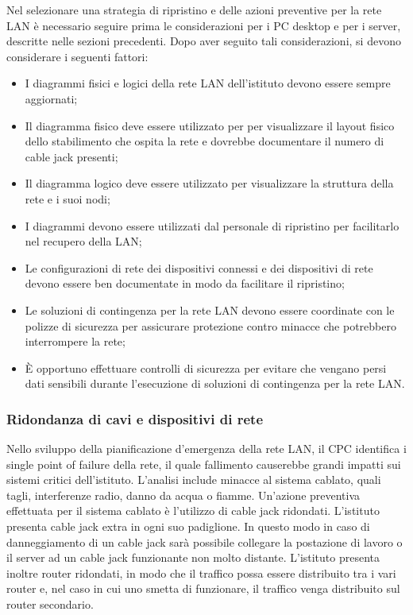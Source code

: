 \documentclass[12pt, a4paper, titlepage]{report}
\begin{document}
	Nel selezionare una strategia di ripristino e delle azioni preventive per la rete LAN è necessario seguire prima le considerazioni per i PC desktop e per i server, descritte nelle sezioni precedenti. Dopo aver seguito tali considerazioni, si devono considerare i seguenti fattori:
	\begin{itemize}
		\item I diagrammi fisici e logici della rete LAN dell'istituto devono essere sempre aggiornati;
		\item Il diagramma fisico deve essere utilizzato per per visualizzare il layout fisico dello stabilimento che ospita la rete e dovrebbe documentare il numero di cable jack presenti;
		\item Il diagramma logico deve essere utilizzato per visualizzare la struttura della rete e i suoi nodi;
		\item I diagrammi devono essere utilizzati dal personale di ripristino per facilitarlo nel recupero della LAN;
		\item Le configurazioni di rete dei dispositivi connessi e dei dispositivi di rete devono essere ben documentate in modo da facilitare il ripristino;
		\item Le soluzioni di contingenza per la rete LAN devono essere coordinate con le polizze di sicurezza per assicurare protezione contro minacce che potrebbero interrompere la rete;
		\item È opportuno effettuare controlli di sicurezza per evitare che vengano persi dati sensibili durante l'esecuzione di soluzioni di contingenza per la rete LAN.
	\end{itemize}
	\subsubsection{Ridondanza di cavi e dispositivi di rete}
	
		Nello sviluppo della pianificazione d'emergenza della rete LAN, il CPC identifica i single point of failure della rete, il quale fallimento causerebbe grandi impatti sui sistemi critici dell'istituto. L'analisi include minacce al sistema cablato, quali tagli, interferenze radio, danno da acqua o fiamme. Un'azione preventiva effettuata per il sistema cablato è l'utilizzo di cable jack ridondati. L'istituto presenta cable jack extra in ogni suo padiglione. In questo modo in caso di danneggiamento di un cable jack sarà possibile collegare la postazione di lavoro o il server ad un cable jack funzionante non molto distante. L'istituto presenta inoltre router ridondati, in modo che il traffico possa essere distribuito tra i vari router e, nel caso in cui uno smetta di funzionare, il traffico venga distribuito sul router secondario.
	
\end{document}
